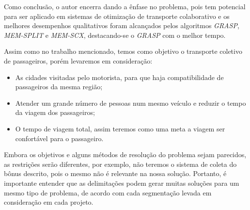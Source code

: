 Como conclusão, o autor encerra dando a ênfase no problema, pois tem potencial para ser aplicado em sistemas de otimização de transporte colaborativo e os melhores desempenhos qualitativos foram alcançados pelos algoritmos \emph{GRASP}, \emph{MEM-SPLIT} e \emph{MEM-SCX}, destacando-se o \emph{GRASP} com o melhor tempo.

Assim como no trabalho mencionado, temos como objetivo o transporte coletivo de passageiros, porém levaremos em consideração:
\begin{itemize}
    \item As cidades visitadas pelo motorista, para que haja compatibilidade de passageiros da mesma região;
    \item Atender um grande número de pessoas num mesmo veículo e reduzir o tempo da viagem dos passageiros; 
    \item O tempo de viagem total, assim teremos como uma meta a viagem ser confortável para o passageiro.
\end{itemize}

Embora os objetivos e alguns métodos de resolução do problema sejam parecidos, as restrições serão diferentes, por exemplo, não teremos o sistema de coleta do bônus descrito, pois o mesmo não é relevante na nossa solução. Portanto, é importante entender que as delimitações podem gerar muitas soluções para um mesmo tipo de problema, de acordo com cada segmentação levada em consideração em cada projeto.

